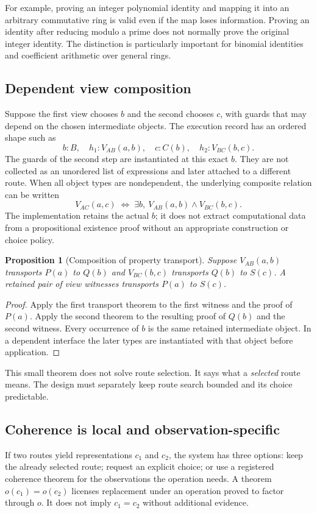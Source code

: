 \documentclass[11pt,letterpaper]{article}
\newtheorem{proposition}[theorem]{Proposition}
\theoremstyle{definition}
\theoremstyle{remark}
\begin{document}
For example, proving an integer polynomial identity and mapping it into an
arbitrary commutative ring is valid even if the map loses information. Proving
an identity after reducing modulo a prime does not normally prove the original
integer identity. The distinction is particularly important for binomial
identities and coefficient arithmetic over general rings.

\subsection{Dependent view composition}
Suppose the first view chooses $b$ and the second chooses $c$, with guards that
may depend on the chosen intermediate objects. The execution record has an
ordered shape such as
\[
 b:B,\quad h_1:V_{AB}(a,b),\quad
 c:C(b),\quad h_2:V_{BC}(b,c).
\]
The guards of the second step are instantiated at this exact $b$. They are not
collected as an unordered list of expressions and later attached to a different
route. When all object types are nondependent, the underlying composite
relation can be written
\[
 V_{AC}(a,c)\;\Longleftrightarrow\;
 \exists b,\ V_{AB}(a,b)\land V_{BC}(b,c).
\]
The implementation retains the actual $b$; it does not extract computational
data from a propositional existence proof without an appropriate construction
or choice policy.

\begin{proposition}[Composition of property transport]
Suppose $V_{AB}(a,b)$ transports $P(a)$ to $Q(b)$ and $V_{BC}(b,c)$ transports
$Q(b)$ to $S(c)$. A retained pair of view witnesses transports $P(a)$ to $S(c)$.
\end{proposition}
\begin{proof}
Apply the first transport theorem to the first witness and the proof of $P(a)$.
Apply the second theorem to the resulting proof of $Q(b)$ and the second witness.
Every occurrence of $b$ is the same retained intermediate object. In a dependent
interface the later types are instantiated with that object before application.
\end{proof}
This small theorem does not solve route selection. It says what a \emph{selected}
route means. The design must separately keep route search bounded and its choice
predictable.

\subsection{Coherence is local and observation-specific}
If two routes yield representations $c_1$ and $c_2$, the system has three options:
keep the already selected route; request an explicit choice; or use a registered
coherence theorem for the observations the operation needs. A theorem
$o(c_1)=o(c_2)$ licenses replacement under an operation proved to factor through
$o$. It does not imply $c_1=c_2$ without additional evidence.
\end{document}
